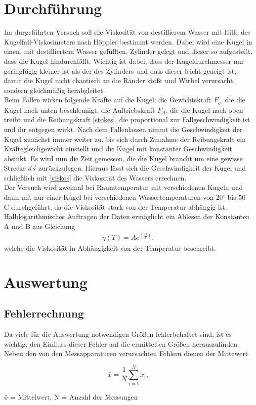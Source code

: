 	\section{Durchführung}
Im durgeführten Versuch soll die Viskosität von destillierem Wasser mit Hilfe des Kugelfall-Viskosimeters nach Höppler bestimmt werden. Dabei wird eine Kugel in einen, mit destilliertem Wasser gefüllten, Zylinder gelegt und dieser so aufgestellt, dass die Kugel hindurchfällt. Wichtig ist dabei, dass der Kugeldurchmesser nur geringfügig kleiner ist als der des Zylinders und dass dieser leicht geneigt ist, damit die Kugel nicht chaotisch an die Ränder stößt und Wirbel verursacht, sondern gleichmäßig herabgleitet.\\
Beim Fallen wirken folgende Kräfte auf die Kugel: die Gewichtskraft $F_g$, die die Kugel nach unten beschleunigt, die Auftriebskraft $F_A$, die die Kugel nach oben treibt und die Reibungskraft \eqref{stokes}, die proportional zur Fallgeschwindigkeit ist und ihr entgegen wirkt. Nach dem Fallenlassen nimmt die Geschwindigkeit der Kugel zunächst immer weiter zu, bis sich durch Zunahme der Reibungskraft ein Kräftegleichgewicht einstellt und die Kugel mit konstanter Geschwindigkeit absinkt.
Es wird nun die Zeit gemessen, die die Kugel braucht um eine gewisse Strecke $d \vec{s}$ zurückzulegen. Hieraus lässt sich die Geschwindigkeit der Kugel und schließlich mit \eqref{viskos} die Viskosität des Wassers errechnen.\\
Der Versuch wird zweimal bei Raumtemperatur mit verschiedenen Kugeln und dann mit nur einer Kugel bei verschiedenen Wassertemperaturen von $20 ^\circ $ bis $50 ^\circ $ C durchgeführt, da die Viskosität stark von der Temperatur abhängig ist. Halblogarithmisches Auftragen der Daten ermöglicht ein Ablesen der Konstanten A und B aus Gleichung
\begin{align}
	\eta(T)=Ae^{\left(\frac{B}{T}\right)},
	\label{andrade}
\end{align}
welche die Viskosität in Abhängigkeit von der Temperatur beschreibt.

\section{Auswertung}
\subsection{Fehlerrechnung}
Da viele für die Auswertung notwendigen Größen fehlerbehaftet sind, ist es wichtig, den Einfluss dieser Fehler auf die ermittelten
Größen herauszufinden. Neben den von den Messapparaturen verursachten Fehlern dienen der Mittewert
\newpage
\begin{formel}
\begin{equation}
 \bar{x} = \frac1N \sum_{i=1}^{N} x_i,
\end{equation}
\caption*{\small{$\bar{x}$ = Mittelwert, N = Anzahl der Messungen}}
\end{formel}

